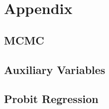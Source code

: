 \section{Appendix}
\subsection{MCMC}
\label{sec:mcmc}
\subsection{Auxiliary Variables}
\subsection{Probit Regression}
\label{sec:probit_review}



%
%
%
%
%
